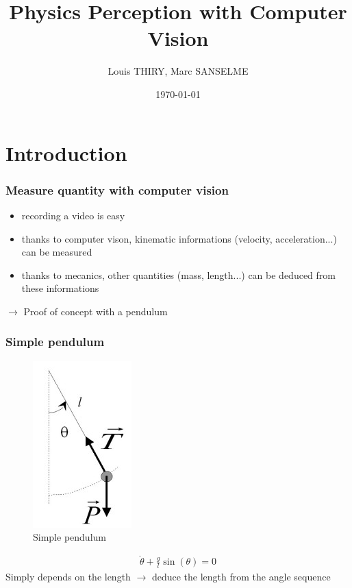 \documentclass{beamer}
\title[Project Object Recognition]{Physics Perception with Computer Vision}
\author{Louis THIRY, Marc SANSELME}
\institute[MVA]
{ENS-Cachan}
\date{\today}
\begin{document}
\begin{frame}
\titlepage
\end{frame}



\section{Introduction}

\begin{frame}
\frametitle{Measure quantity with computer vision}
\begin{itemize}
  \item recording a video is easy
  \item thanks to computer vison, kinematic informations (velocity, acceleration...) can be measured
  \item thanks to mecanics, other quantities (mass, length...) can be deduced from these informations
\end{itemize}
$\rightarrow$ Proof of concept with a pendulum
\end{frame}

\begin{frame}
\frametitle{Simple pendulum}
\begin{figure}
  \captionsetup{labelformat=empty}
  \includegraphics{pendule.jpg}
  \caption{Simple pendulum}
\end{figure}
\begin{align*}
  \ddot{\theta} + \frac{g}{l} \sin (\theta) = 0
\end{align*}
Simply depends on the length $\rightarrow$ deduce the length from the angle sequence
\end{frame}
\end{document}
